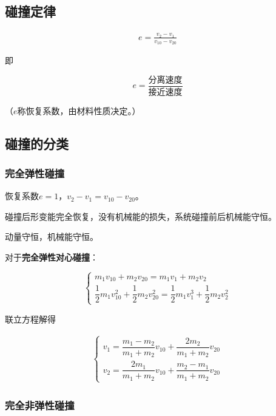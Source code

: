 \documentclass[12pt, a4paper]{article}
\numberwithin{equation}{section}
\begin{document}
\subsection{碰撞定律}

    \begin{align}
        e = \frac{v_2 - v_1}{v_{10} - v_{20}}
    \end{align}

    即

    $$
    e = \frac{\text{分离速度}}{\text{接近速度}}
    $$

    （\(e\)称恢复系数，由材料性质决定。）

\subsection{碰撞的分类}

\subsubsection{完全弹性碰撞}

    恢复系数\(e=1\)，\(v_2-v_1=v_{10} - v_{20}\)。
    
    碰撞后形变能完全恢复，没有机械能的损失，系统碰撞前后机械能守恒。

    动量守恒，机械能守恒。

    对于\textbf{完全弹性对心碰撞}：

    $$
        \left\{\begin{array}{l}
        m_1 v_{10}+m_2 v_{20}=m_1 v_1+m_2 v_2 \\
        \dfrac{1}{2} m_1 v_{10}^2+\dfrac{1}{2} m_2 v_{20}^2=\dfrac{1}{2} m_1 v_1^3+\dfrac{1}{2} m_2 v_2^2
        \end{array}\right.
    $$

    联立方程解得

    \begin{align}
        \left\{\begin{array}{l}
            v_1=\dfrac{m_1-m_2}{m_1+m_2} v_{10}+\dfrac{2 m_2}{m_1+m_2} v_{20} \\
            v_2=\dfrac{2 m_1}{m_1+m_2} v_{10}+\dfrac{m_2-m_1}{m_1+m_2} v_{20}
        \end{array}\right.
    \end{align}

\subsubsection{完全非弹性碰撞}
\end{document}
